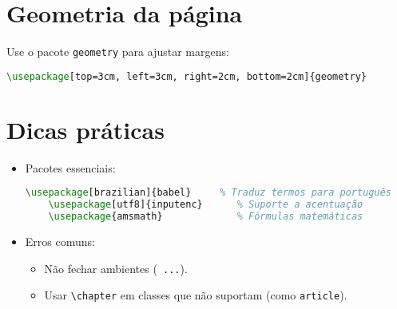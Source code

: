 \section{Geometria da página}

Use o pacote \verb|geometry| para ajustar margens:

\begin{lstlisting}[language=tex, caption=Ajuste das margens com o pacote \texttt{geometry}]
    \usepackage[top=3cm, left=3cm, right=2cm, bottom=2cm]{geometry}
\end{lstlisting}

\section{Dicas práticas}

\begin{itemize}
    \item Pacotes essenciais:
    \begin{lstlisting}[language=tex, caption=Pacotes mais fundamentais]
    \usepackage[brazilian]{babel}     % Traduz termos para português
    \usepackage[utf8]{inputenc}      % Suporte a acentuação
    \usepackage{amsmath}             % Fórmulas matemáticas
    \end{lstlisting}
    \item Erros comuns:
    \begin{itemize}
        \item Não fechar ambientes (\verb| ...|).
        \item Usar \verb|\chapter| em classes que não suportam (como \verb|article|).
    \end{itemize}
\end{itemize}
